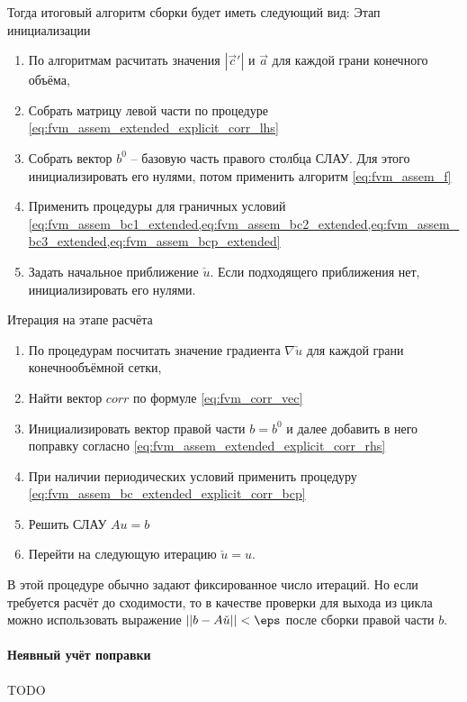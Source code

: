 Тогда итоговый алгоритм сборки будет иметь следующий вид: \newline
{\rm Этап инициализации}
\begin{enumerate}
\item По алгоритмам  расчитать значения $|\vec c'|$  и $\vec a$ для каждой грани конечного объёма,
\item Собрать матрицу левой части по процедуре \cref{eq:fvm_assem_extended_explicit_corr_lhs}
\item Собрать вектор $b^0$ -- базовую часть правого столбца СЛАУ. Для этого инициализировать его нулями, потом применить алгоритм \cref{eq:fvm_assem_f}
\item Применить процедуры для граничных условий \cref{eq:fvm_assem_bc1_extended,eq:fvm_assem_bc2_extended,eq:fvm_assem_bc3_extended,eq:fvm_assem_bcp_extended}
\item Задать начальное приближение $\check u$. Если подходящего приближения нет, инициализировать его нулями.
\end{enumerate}
{\rm Итерация на этапе расчёта}
\begin{enumerate}
\item По процедурам  посчитать значение градиента $\nabla{\check u}$ для каждой грани конечнообъёмной сетки,
\item Найти вектор $corr$ по формуле \cref{eq:fvm_corr_vec}
\item Инициализировать вектор правой части $b = b^0$ и далее добавить в него поправку согласно \cref{eq:fvm_assem_extended_explicit_corr_rhs}
\item При наличии периодических условий применить процедуру \cref{eq:fvm_assem_bc_extended_explicit_corr_bcp}
\item Решить СЛАУ $A u = b$
\item Перейти на следующую итерацию $\check u = u$.
\end{enumerate}

В этой процедуре обычно задают фиксированное число итераций. Но если требуется
расчёт до сходимости, то в качестве проверки для выхода из цикла можно
использовать выражение $||b - A \check u|| < \eps$
после сборки правой части $b$.

\paragraph{Неявный учёт поправки}
TODO

